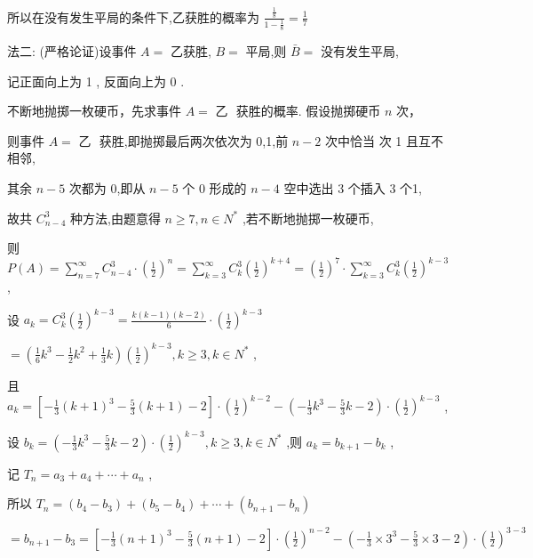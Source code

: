\documentclass[10pt]{article}
\newcommand*\circled[1]{\tikz[baseline=(char.base)]{\node[shape=circle,draw,inner sep=1.5pt] (char) {\small #1};}}
\begin{document}
所以在没有发生平局的条件下,乙获胜的概率为 \(\frac{\frac{1}{8}}{1 - \frac{1}{8}} = \frac{1}{7}\)

法二: (严格论证)设事件 \(A =\) 乙获胜, \(B =\) 平局,则 \(\bar{B} =\) 没有发生平局,

记正面向上为 1 , 反面向上为 0 .

 \circled{1} 不断地抛掷一枚硬币，先求事件 \(A = \text{ 乙 }\) 获胜的概率. 假设抛掷硬币 \(n\) 次，

则事件 \(A = \text{ 乙 }\) 获胜,即抛掷最后两次依次为 0,1,前 \(n - 2\) 次中恰当 次 1 且互不相邻,

其余 \(n - 5\) 次都为 0,即从 \(n - 5\) 个 0 形成的 \(n - 4\) 空中选出 3 个插入 3 个1,

故共 \({C}_{n - 4}^{3}\) 种方法,由题意得 \(n \geq  7,n \in  {N}^{ * }\) ,若不断地抛掷一枚硬币,

则 \(P\left( A\right)  = \mathop{\sum }\limits_{{n = 7}}^{\infty }{C}_{n - 4}^{3} \cdot  {\left( \frac{1}{2}\right) }^{n} = \mathop{\sum }\limits_{{k = 3}}^{\infty }{C}_{k}^{3}{\left( \frac{1}{2}\right) }^{k + 4} = {\left( \frac{1}{2}\right) }^{7} \cdot  \mathop{\sum }\limits_{{k = 3}}^{\infty }{C}_{k}^{3}{\left( \frac{1}{2}\right) }^{k - 3}\) ,

设 \({a}_{k} = {C}_{k}^{3}{\left( \frac{1}{2}\right) }^{k - 3} = \frac{k\left( {k - 1}\right) \left( {k - 2}\right) }{6} \cdot  {\left( \frac{1}{2}\right) }^{k - 3}\)

\(= \left( {\frac{1}{6}{k}^{3} - \frac{1}{2}{k}^{2} + \frac{1}{3}k}\right) {\left( \frac{1}{2}\right) }^{k - 3},k \geq  3,k \in  {N}^{ * }\) ,

且 \({a}_{k} = \left\lbrack  {-\frac{1}{3}{\left( k + 1\right) }^{3} - \frac{5}{3}\left( {k + 1}\right)  - 2}\right\rbrack   \cdot  {\left( \frac{1}{2}\right) }^{k - 2} - \left( {-\frac{1}{3}{k}^{3} - \frac{5}{3}k - 2}\right)  \cdot  {\left( \frac{1}{2}\right) }^{k - 3}\) ,

设 \({b}_{k} = \left( {-\frac{1}{3}{k}^{3} - \frac{5}{3}k - 2}\right)  \cdot  {\left( \frac{1}{2}\right) }^{k - 3},k \geq  3,k \in  {N}^{ * }\) ,则 \({a}_{k} = {b}_{k + 1} - {b}_{k}\) ,

记 \({T}_{n} = {a}_{3} + {a}_{4} + \cdots  + {a}_{n}\) ,

所以 \({T}_{n} = \left( {{b}_{4} - {b}_{3}}\right)  + \left( {{b}_{5} - {b}_{4}}\right)  + \cdots  + \left( {{b}_{n + 1} - {b}_{n}}\right)\)

\(= {b}_{n + 1} - {b}_{3} = \left\lbrack  {-\frac{1}{3}{\left( n + 1\right) }^{3} - \frac{5}{3}\left( {n + 1}\right)  - 2}\right\rbrack   \cdot  {\left( \frac{1}{2}\right) }^{n - 2} - \left( {-\frac{1}{3} \times  {3}^{3} - \frac{5}{3} \times  3 - 2}\right)  \cdot  {\left( \frac{1}{2}\right) }^{3 - 3}\)
\end{document}
